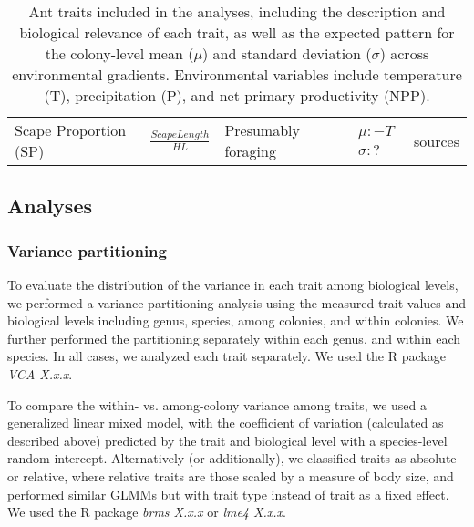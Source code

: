 \documentclass[review,preprint,3p]{elsarticle}
\begin{document}
\begin{table}[t]
\begin{tabular}{m{} | >{\raggedright}m{} | m{} | >{\raggedright}m{} | m{}}
			\hline
			Scape Proportion (SP) & $\displaystyle \frac{Scape Length}{HL}$ & 
				Presumably foraging &
				$\begin{aligned} \mu: -T \\  \sigma: ? \end{aligned}$ & 
				{\tiny sources} \\
\end{tabular}
\caption{Ant traits included in the analyses, including the description and biological relevance of each trait, as well as the expected pattern for the colony-level mean ($\mu$) and standard deviation ($\sigma$) across environmental gradients. Environmental variables include temperature (T), precipitation (P), and net primary productivity (NPP).} 
\label{table:trait_description}
\end{table}

	
	\subsection{Analyses}
	
	\subsubsection{Variance partitioning}
	To evaluate the distribution of the variance in each trait among biological levels, we performed a variance partitioning analysis using the measured trait values and biological levels including genus, species, among colonies, and within colonies. We further performed the partitioning separately within each genus, and within each species. In all cases, we analyzed each trait separately. We used the R package \emph{VCA X.x.x}. 
		
	To compare the within- vs. among-colony variance among traits, we used a generalized linear mixed model, with the coefficient of variation (calculated as described above) predicted by the trait and biological level with a species-level random intercept. Alternatively (or additionally), we classified traits as absolute or relative, where relative traits are those scaled by a measure of body size, and performed similar GLMMs but with trait type instead of trait as a fixed effect. We used the R package \emph{brms X.x.x} or \emph{lme4 X.x.x}.
	
\end{document}
